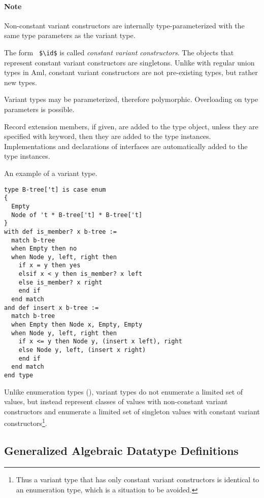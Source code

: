 \paragraph{Note}
Non-constant variant constructors are internally type-parameterized with the same type parameters as the variant type. 

The form ~\lstinline!$\id$! is called {\em constant variant constructors}. The objects that represent constant variant constructors are singletons. Unlike with regular union types in Aml, constant variant constructors are not pre-existing types, but rather new types. 

Variant types may be parameterized, therefore polymorphic. Overloading on type parameters is possible. 

Record extension members, if given, are added to the type object, unless they are specified with  keyword, then they are added to the type instances. Implementations and declarations of interfaces are automatically added to the type instances. 

\example An example of a variant type. 
\begin{lstlisting}
type B-tree['t] is case enum 
{
  Empty
  Node of 't * B-tree['t] * B-tree['t]
}
with def is_member? x b-tree :=
  match b-tree
  when Empty then no
  when Node y, left, right then
    if x = y then yes
    elsif x < y then is_member? x left
    else is_member? x right
    end if
  end match
and def insert x b-tree := 
  match b-tree
  when Empty then Node x, Empty, Empty
  when Node y, left, right then
    if x <= y then Node y, (insert x left), right
    else Node y, left, (insert x right)
    end if
  end match
end type
\end{lstlisting}

Unlike enumeration types (), variant types do not enumerate a limited set of values, but instead represent classes of values with non-constant variant constructors and enumerate a limited set of singleton values with constant variant constructors\footnote{Thus a variant type that has only constant variant constructors is identical to an enumeration type, which is a situation to be avoided.}. 





\subsection{Generalized Algebraic Datatype Definitions}
\label{sec:gadt-types}

